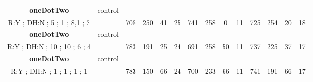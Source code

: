 \begin{table}[]
{\begin{tabular}{|c|c|c|c|c|c|c|c|c|c|c|c|c|c|}
\cellcolor{blue!15}\textbf{oneDotTwo} & control& {\color[HTML]{00009B} } & {\color[HTML]{9A0000} } & {\color[HTML]{009901} } &  & {\color[HTML]{00009B} } & {\color[HTML]{9A0000} } & {\color[HTML]{009901} } &  & {\color[HTML]{00009B} } & {\color[HTML]{9A0000} } & {\color[HTML]{009901} } &  \\ 
\cellcolor{ blue!15}R:Y ; DH:N ; 5 ; 1 ; 8,1 ; 3 &  & \multirow{-2}{*}{{\color[HTML]{00009B} 708}} & \multirow{-2}{*}{{\color[HTML]{9A0000} 250}} & \multirow{-2}{*}{{\color[HTML]{009901} 41}} & \multirow{-2}{*}{25} & \multirow{-2}{*}{{\color[HTML]{00009B} 741}} & \multirow{-2}{*}{{\color[HTML]{9A0000} 258}} & \multirow{-2}{*}{{\color[HTML]{009901} 0}} & \multirow{-2}{*}{11} & \multirow{-2}{*}{{\color[HTML]{00009B} 725}} & \multirow{-2}{*}{{\color[HTML]{9A0000} 254}} & \multirow{-2}{*}{{\color[HTML]{009901} 20}} & \multirow{-2}{*}{18} \\ \hline

\cellcolor{blue!15}\textbf{oneDotTwo} & control& {\color[HTML]{00009B} } & {\color[HTML]{9A0000} } & {\color[HTML]{009901} } &  & {\color[HTML]{00009B} } & {\color[HTML]{9A0000} } & {\color[HTML]{009901} } &  & {\color[HTML]{00009B} } & {\color[HTML]{9A0000} } & {\color[HTML]{009901} } &  \\ 
\cellcolor{ blue!15}R:Y ; DH:N ; 10 ; 10 ; 6 ; 4 &  & \multirow{-2}{*}{{\color[HTML]{00009B} 783}} & \multirow{-2}{*}{{\color[HTML]{9A0000} 191}} & \multirow{-2}{*}{{\color[HTML]{009901} 25}} & \multirow{-2}{*}{24} & \multirow{-2}{*}{{\color[HTML]{00009B} 691}} & \multirow{-2}{*}{{\color[HTML]{9A0000} 258}} & \multirow{-2}{*}{{\color[HTML]{009901} 50}} & \multirow{-2}{*}{11} & \multirow{-2}{*}{{\color[HTML]{00009B} 737}} & \multirow{-2}{*}{{\color[HTML]{9A0000} 225}} & \multirow{-2}{*}{{\color[HTML]{009901} 37}} & \multirow{-2}{*}{17} \\ \hline

\cellcolor{blue!15}\textbf{oneDotTwo} & control& {\color[HTML]{00009B} } & {\color[HTML]{9A0000} } & {\color[HTML]{009901} } &  & {\color[HTML]{00009B} } & {\color[HTML]{9A0000} } & {\color[HTML]{009901} } &  & {\color[HTML]{00009B} } & {\color[HTML]{9A0000} } & {\color[HTML]{009901} } &  \\ 
\cellcolor{ blue!15}R:Y ; DH:N ; 1 ; 1 ; 1 ; 1 &  & \multirow{-2}{*}{{\color[HTML]{00009B} 783}} & \multirow{-2}{*}{{\color[HTML]{9A0000} 150}} & \multirow{-2}{*}{{\color[HTML]{009901} 66}} & \multirow{-2}{*}{24} & \multirow{-2}{*}{{\color[HTML]{00009B} 700}} & \multirow{-2}{*}{{\color[HTML]{9A0000} 233}} & \multirow{-2}{*}{{\color[HTML]{009901} 66}} & \multirow{-2}{*}{11} & \multirow{-2}{*}{{\color[HTML]{00009B} 741}} & \multirow{-2}{*}{{\color[HTML]{9A0000} 191}} & \multirow{-2}{*}{{\color[HTML]{009901} 66}} & \multirow{-2}{*}{17} \\ \hline


\end{tabular}}
\end{table}
